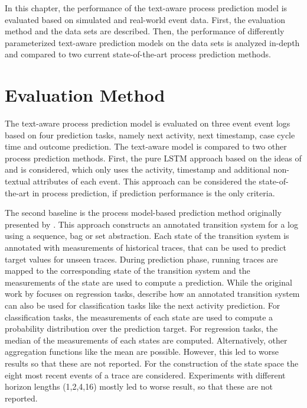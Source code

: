 In this chapter, the performance of the text-aware process prediction model is evaluated based on simulated and real-world event data.
First, the evaluation method and the data sets are described.
Then, the performance of differently parameterized text-aware prediction models on the data sets is analyzed in-depth and compared to two current state-of-the-art process prediction methods.

\section{Evaluation Method}

The text-aware process prediction model is evaluated on three event event logs based on four prediction tasks, namely next activity, next timestamp, case cycle time and outcome prediction.
The text-aware model is compared to two other process prediction methods.
First, the pure LSTM approach based on the ideas of \citeauthor{DBLP:conf/caise/TaxVRD17} \cite{DBLP:conf/caise/TaxVRD17} and \citeauthor{DBLP:conf/ssci/NavarinVPS17} \cite{DBLP:conf/ssci/NavarinVPS17} is considered, which only uses the activity, timestamp and additional non-textual attributes of each event.
This approach can be considered the state-of-the-art in process prediction, if prediction performance is the only criteria.

The second baseline is the process model-based prediction method originally presented by \citeauthor{DBLP:journals/is/AalstSS11} \cite{DBLP:journals/is/AalstSS11}.
This approach constructs an annotated transition system for a log using a sequence, bag or set abstraction.
Each state of the transition system is annotated with measurements of historical traces, that can be used to predict target values for unseen traces.
During prediction phase, running traces are mapped to the corresponding state of the transition system and the measurements of the state are used to compute a prediction.
While the original work by \citeauthor{DBLP:journals/is/AalstSS11} focuses on regression tasks, \citeauthor{DBLP:journals/sosym/TaxTZ20} \cite{DBLP:journals/sosym/TaxTZ20} describe how an annotated transition system can also be used for classification tasks like the next activity prediction.
For classification tasks, the measurements of each state are used to compute a probability distribution over the prediction target.
For regression tasks, the median of the measurements of each states are computed.
Alternatively, other aggregation functions like the mean are possible.
However, this led to worse results so that these are not reported.
For the construction of the state space the eight most recent events of a trace are considered.
Experiments with different horizon lengths (1,2,4,16) mostly led to worse result, so that these are not reported.

